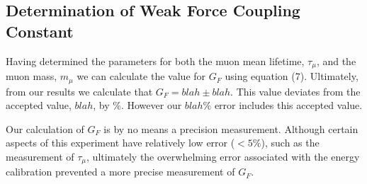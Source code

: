 \subsection{Determination of Weak Force Coupling Constant}

Having determined the parameters for both the muon mean lifetime, $\tau_{\mu}$, and the muon mass, $m_{\mu}$ we can calculate the value for $G_{F}$ using equation (7). Ultimately, from our results we calculate that $G_{F}=blah \pm blah$.  This value deviates from the accepted value, $blah$, by $\%$. However our $blah\%$ error includes this accepted value.

Our calculation of $G_F$ is by no means a precision measurement.  Although certain aspects of this experiment have relatively low error ($< 5\%$), such as the measurement of $\tau_{\mu}$, ultimately the overwhelming error associated with the energy calibration prevented a more precise measurement of $G_F$.